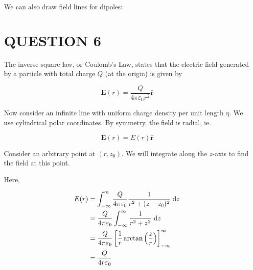 \documentclass[a4paper]{article}
\begin{document}
We can also draw field lines for dipoles:
\begin{center}
\end{center}


\section{QUESTION 6}

The inverse square law, or Coulomb's Law, states that the electric field generated by a particle with total charge $ Q $ (at the origin) is given by

\[ \mathbf{E}(r) = \frac{Q}{4 \pi \varepsilon_{0} r^{2}} \hat{\mathbf{r}} \]

Now consider an infinite line with uniform charge density per unit length $ \eta $.
We use cylindrical polar coordinates. By symmetry, the field is radial, ie.

\[ \mathbf{E}(r) = E(r) \hat{\mathbf{r}} \]

Consider an arbitrary point at $ (r,z_{0}) $. We will integrate along the $ z $-axis to find the field at this point. 


%	

Here,

\begin{align*}
E(r) & = \int_{-\infty}^{\infty} \frac{Q}{4 \pi \varepsilon_{0}} \frac{1}{r^{2} + (z-z_{0})^{2}} \; \mathrm{d} z \\
& = \frac{Q}{4 \pi \varepsilon_{0}} \int_{-\infty}^{\infty}  \frac{1}{r^{2} + z^{2}} \; \mathrm{d} z \\
& = \frac{Q}{4 \pi \varepsilon_{0}} \left[   \frac{1}{r} \arctan \left(  \frac{z}{r} \right)   \right]_{-\infty}^{\infty}  \\
& = \frac{Q}{4 r \varepsilon_{0}} 
\end{align*}
\end{document}
